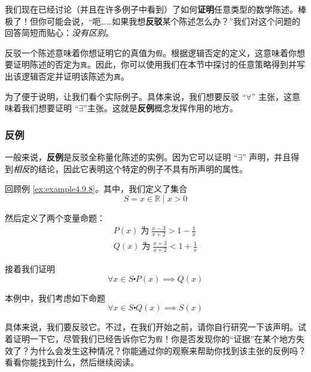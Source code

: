 我们现在已经讨论（并且在许多例子中看到）了如何\textbf{证明}任意类型的数学陈述。棒极了！但你可能会说，``呃……如果我想\textbf{反驳}某个陈述怎么办？''我们对这个问题的回答简短而贴心：\emph{没有区别}。 

反驳一个陈述意味着你想证明它的真值为\verb|假|。根据逻辑否定的定义，这意味着你想要证明陈述的否定为\verb|真|。因此，你可以使用我们在本节中探讨的任意策略得到并写出该逻辑否定并证明该陈述为\verb|真|。

为了便于说明，让我们看个实际例子。具体来说，我们想要反驳 ``$\forall$'' 主张，这意味着我们想要证明 ``$\exists$''主张。这就是\textbf{反例}概念发挥作用的地方。

\subsubsection*{反例}

一般来说，\textbf{反例}是反驳全称量化陈述的实例。因为它可以证明 ``$\exists$'' 声明，并且得到\emph{相反}的结论，因此它表明这个特定的例子不具有所声明的属性。

\begin{example}
    回顾例 \ref{ex:example4.9.8}。其中，我们定义了集合
    \[S = {x \in \mathbb{R} \mid x > 0}\]

    然后定义了两个变量命题：
    \begin{align*}
        P(x) \;\text{为}\; \frac{x-3}{x+2}>1-\frac{1}{x} \\
        Q(x) \;\text{为}\; \frac{x+3}{x+2}<1+\frac{1}{x}
    \end{align*}

    接着我们证明
    \[\forall x \in S \centerdot P(x) \implies Q(x)\]

    本例中，我们考虑如下命题
    \[\forall x \in S \centerdot Q(x) \implies S(x)\]
\end{example}

具体来说，我们要反驳它。不过，在我们开始之前，请你自行研究一下该声明。试着证明一下它，尽管我们已经告诉你它为\verb|假|！你是否发现你的``证据''在某个地方失效了？为什么会发生这种情况？你能通过你的观察来帮助你找到该主张的反例吗？看看你能找到什么，然后继续阅读。

